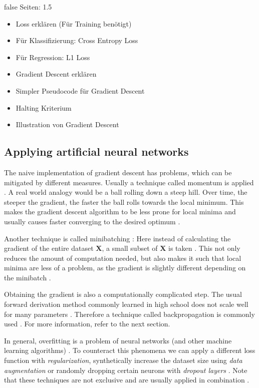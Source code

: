 \documentclass[draft,final,oneside]{vutinfth} %
\begin{document}
\if false
Seiten: 1.5
\begin{itemize}
\item Loss erklären (Für Training benötigt)
\item Für Klassifizierung: Cross Entropy Loss
\item Für Regression: L1 Loss
\item Gradient Descent erklären
\item Simpler Pseudocode für Gradient Descent
\item Halting Kriterium
\item Illustration von Gradient Descent

\end{itemize}
\fi
\pagebreak
\subsection{Applying artificial neural networks}

The naive implementation of gradient descent has problems, which can be mitigated by different measures. Usually a technique called momentum is applied \cite{Goodfellow-et-al-2016}. A real world analogy would be a ball rolling down a steep hill. Over time, the steeper the gradient, the faster the ball rolls towards the local minimum. This makes the gradient descent algorithm to be less prone for local minima and usually causes faster converging to the desired optimum \cite{Goodfellow-et-al-2016}.

Another technique is called minibatching \cite{Goodfellow-et-al-2016}: Here instead of calculating the gradient of the entire dataset $\boldsymbol{X}$, a small subset of $\boldsymbol{X}$ is taken \cite{Goodfellow-et-al-2016}. This not only reduces the amount of computation needed, but also makes it such that local minima are less of a problem, as the gradient is slightly different depending on the minibatch \cite{Goodfellow-et-al-2016}.

Obtaining the gradient is also a computationally complicated step. The usual forward derivation method commonly learned in high school does not scale well for many parameters \cite{colahbackprop}. Therefore a technique called backpropagation is commonly used \cite{colahbackprop}. For more information, refer to the next section.

In general, overfitting is a problem of neural networks (and other machine learning algorithms) \cite{aimodern}. To counteract this phenomena we can apply a different loss function with \textit{regularization}, synthetically increase the dataset size using \textit{data augmentation} or randomly dropping certain neurons with \textit{dropout layers} \cite{Goodfellow-et-al-2016}. Note that these techniques are not exclusive and are usually applied in combination \cite{Goodfellow-et-al-2016}.
\end{document}
